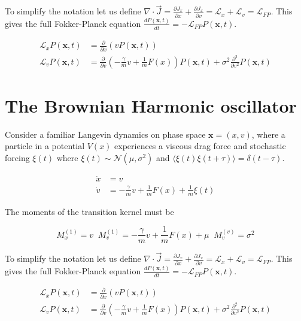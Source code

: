 \documentclass{article}
\begin{document}
To simplify the notation let us define $\nabla\cdot \vec{J} = \frac{\partial J_{x}}{\partial x} + \frac{\partial J_{x}}{\partial v}= \mathcal{L}_{x} + \mathcal{L}_{v} = \mathcal{L}_{FP}$. This gives the full Fokker-Planck equation $\frac{dP(\bm{x},t)}{dt} = -\mathcal{L}_{FP}P(\bm{x},t)$. 

\begin{align*}
\mathcal{L}_{x}P(\bm{x},t) &= \frac{\partial}{\partial x}\left(vP(\bm{x},t)\right)\\
\mathcal{L}_{v}P(\bm{x},t) &= \frac{\partial}{\partial v}\left(-\frac{\gamma}{m}v + \frac{1}{m}F(x)\right)P(\bm{x},t) + \sigma^{2}\frac{\partial^{2}}{\partial v^{2}}P(\bm{x},t)
\end{align*}


\section{The Brownian Harmonic oscillator}

Consider a familiar Langevin dynamics on phase space $\bm{x} = (x,v)$, where a particle in a potential $V(x)$ experiences a viscous drag force and stochastic forcing $\xi(t)$ where $\xi(t)\sim\mathcal{N}(\mu,\sigma^{2})$ and $\langle \xi(t)\xi(t+\tau)\rangle = \delta(t-\tau)$. 

\begin{align*}
\dot{x} &= v\\
\dot{v} &= -\frac{\gamma}{m}v + \frac{1}{m}F(x) + \frac{1}{m}\xi(t)
\end{align*}

The moments of the transition kernel must be

\begin{equation*}
M_{x}^{(1)} = v  \;\; M_{v}^{(1)} = -\frac{\gamma}{m}v + \frac{1}{m}F(x) + \mu \;\; M_{v}^{(v)} = \sigma^{2}
\end{equation*}

To simplify the notation let us define $\nabla\cdot \vec{J} = \frac{\partial J_{x}}{\partial x} + \frac{\partial J_{x}}{\partial v}= \mathcal{L}_{x} + \mathcal{L}_{v} = \mathcal{L}_{FP}$. This gives the full Fokker-Planck equation $\frac{dP(\bm{x},t)}{dt} = -\mathcal{L}_{FP}P(\bm{x},t)$. 

\begin{align*}
\mathcal{L}_{x}P(\bm{x},t) &= \frac{\partial}{\partial x}\left(vP(\bm{x},t)\right)\\
\mathcal{L}_{v}P(\bm{x},t) &= \frac{\partial}{\partial v}\left(-\frac{\gamma}{m}v + \frac{1}{m}F(x)\right)P(\bm{x},t) + \sigma^{2}\frac{\partial^{2}}{\partial v^{2}}P(\bm{x},t)
\end{align*}
\end{document}
